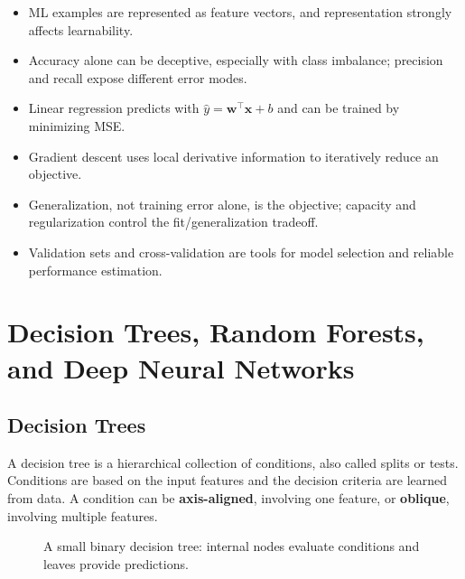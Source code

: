 \documentclass[11pt,a4paper]{report}
\newcommand{\vect}[1]{\bm{#1}}
\begin{document}
\begin{takeawaybox}[breakable=false,before skip=4pt]
\begin{itemize}[itemsep=2pt,topsep=2pt,parsep=0pt]
  \item ML examples are represented as feature vectors, and representation strongly affects learnability.
  \item Accuracy alone can be deceptive, especially with class imbalance; precision and recall expose different error modes.
  \item Linear regression predicts with $\hat y=\vect{w}^{\top}\vect{x}+b$ and can be trained by minimizing MSE.
  \item Gradient descent uses local derivative information to iteratively reduce an objective.
  \item Generalization, not training error alone, is the objective; capacity and regularization control the fit/generalization tradeoff.
  \item Validation sets and cross-validation are tools for model selection and reliable performance estimation.
\end{itemize}
\end{takeawaybox}

\chapter{Decision Trees, Random Forests, and Deep Neural Networks}

\section{Decision Trees}

A decision tree is a hierarchical collection of conditions, also called splits or tests. Conditions are based on the input features and the decision criteria are learned from data. A condition can be \textbf{axis-aligned}, involving one feature, or \textbf{oblique}, involving multiple features.

\begin{figure}[H]
\centering
{}
\caption{A small binary decision tree: internal nodes evaluate conditions and leaves provide predictions.}
\label{fig:decision-tree}
\end{figure}
\end{document}
